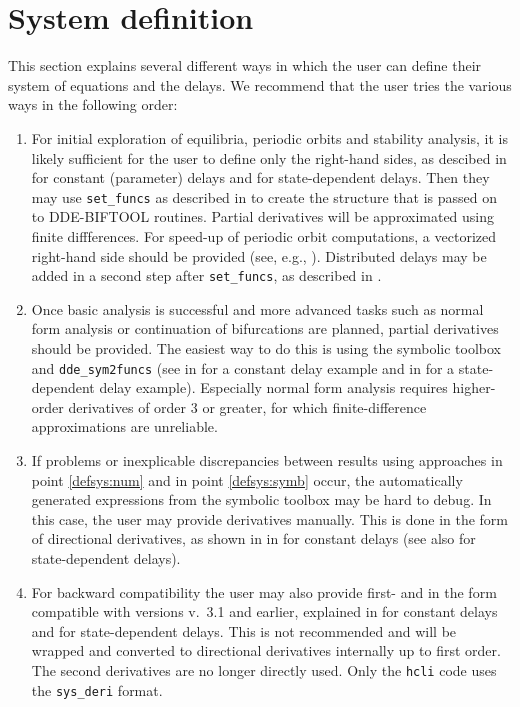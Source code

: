 \documentclass[10pt]{scrartcl}
\newcommand{\DDEBIFCODE}{\textsc{DDE-BIFTOOL}}
\newcommand{\blist}[1]{\mbox{\lstinline!#1!}}
\begin{document}
\section{System definition}\label{sec:system:def}
This section explains several different ways in which the user can
define their system of equations and the delays. We recommend that the
user tries the various ways in the following order:
\begin{enumerate}
\item \label{defsys:num} For initial exploration of equilibria, periodic orbits and
  stability analysis, it is likely sufficient for the user to define only
  the right-hand sides, as descibed in
   for constant (parameter) delays and
   for state-dependent delays. Then they may
  use \blist{set_funcs} as described in  to create the
  structure that is passed on to \DDEBIFCODE{} routines. Partial
  derivatives will be approximated using finite diffferences. For
  speed-up of periodic orbit computations, a vectorized right-hand
  side should be provided (see, e.g., ). Distributed delays may be added in a second step after \blist{set_funcs}, as described in .
\item \label{defsys:symb} Once basic analysis is successful and more advanced tasks such
  as normal form analysis or continuation of bifurcations are planned,
  partial derivatives should be provided. The easiest way to do this
  is using the symbolic toolbox and \blist{dde_sym2funcs} (see
   in  for a constant delay
  example and  in  for a
  state-dependent delay example). Especially normal form analysis
  requires higher-order derivatives of order $3$ or greater, for which
  finite-difference approximations are unreliable.
\item If problems or inexplicable discrepancies between results using
  approaches in point \ref{defsys:num} and in point \ref{defsys:symb}
  occur, the automatically generated expressions from the symbolic
  toolbox may be hard to debug. In this case, the user may provide
  derivatives manually. This is done in the form of directional derivatives,
  as shown in  in  for
  constant delays (see also  for state-dependent
  delays).
\item For backward compatibility the user may also provide first- and
  in the form compatible with versions v.~3.1 and earlier, explained
  in  for constant delays and  for
  state-dependent delays. This is not recommended and will be wrapped
  and converted to directional derivatives internally up to first
  order. The second derivatives are no longer directly used. Only the
  \blist{hcli} code uses the \blist{sys_deri} format.
\end{enumerate}
\end{document}
